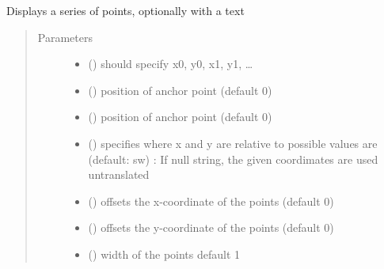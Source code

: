 \documentclass[letterpaper,10pt,english]{sphinxmanual}
\begin{document}
\begin{fulllineitems}
\label{\detokenize{Reference:salabim.AnimatePoints}}
Displays a series of points, optionally with a text
\begin{quote}\begin{description}
\item[{Parameters}] \leavevmode\begin{itemize}
\item {} 
 () \textendash{} should specify x0, y0, x1, y1, …

\item {} 
 () \textendash{} position of anchor point (default 0)

\item {} 
 () \textendash{} position of anchor point (default 0)

\item {} 
 () \textendash{} specifies where x and y are relative to 
possible values are (default: sw) : 
If null string, the given coordimates are used untranslated

\item {} 
 () \textendash{} offsets the x-coordinate of the points (default 0)

\item {} 
 () \textendash{} offsets the y-coordinate of the points (default 0)

\item {} 
 () \textendash{} width of the points 
default 1


\end{itemize}
\end{description}
\end{quote}
\end{fulllineitems}
\end{document}
